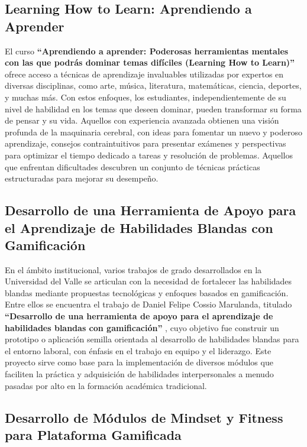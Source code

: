 \subsection{Learning How to Learn: Aprendiendo a Aprender}

El curso \textbf{“Aprendiendo a aprender: Poderosas herramientas mentales con las que podrás dominar temas difíciles (Learning How to Learn)”} \cite{coursera2024} ofrece acceso a técnicas de aprendizaje invaluables utilizadas por expertos en diversas disciplinas, como arte, música, literatura, matemáticas, ciencia, deportes, y muchas más. Con estos enfoques, los estudiantes, independientemente de su nivel de habilidad en los temas que deseen dominar, pueden transformar su forma de pensar y su vida. Aquellos con experiencia avanzada obtienen una visión profunda de la maquinaria cerebral, con ideas para fomentar un nuevo y poderoso aprendizaje, consejos contraintuitivos para presentar exámenes y perspectivas para optimizar el tiempo dedicado a tareas y resolución de problemas. Aquellos que enfrentan dificultades descubren un conjunto de técnicas prácticas estructuradas para mejorar su desempeño.

\subsection{Desarrollo de una Herramienta de Apoyo para el Aprendizaje de Habilidades Blandas con Gamificación}

En el ámbito institucional, varios trabajos de grado desarrollados en la Universidad del Valle se articulan con la necesidad de fortalecer las habilidades blandas mediante propuestas tecnológicas y enfoques basados en gamificación. Entre ellos se encuentra el trabajo de Daniel Felipe Cossio Marulanda, titulado \textbf{“Desarrollo de una herramienta de apoyo para el aprendizaje de habilidades blandas con gamificación”} \cite{cossioMarulanda2024}, cuyo objetivo fue construir un prototipo o aplicación semilla orientada al desarrollo de habilidades blandas para el entorno laboral, con énfasis en el trabajo en equipo y el liderazgo. Este proyecto sirve como base para la implementación de diversos módulos que faciliten la práctica y adquisición de habilidades interpersonales a menudo pasadas por alto en la formación académica tradicional.

\subsection{Desarrollo de Módulos de Mindset y Fitness para Plataforma Gamificada}


